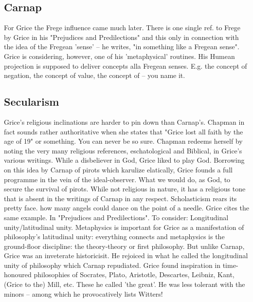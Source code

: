 \documentclass[10pt,titlepage]{book}
\begin{document}
\subsection{Carnap}

For  Grice the Frege influence came much later. There is one single ref. 
to Frege by  Grice in his "Prejudices and Predilections" and this only in 
connection with the  idea of the Fregean 'sense' -- he writes, "in something 
like a Fregean sense".  Grice is considering, however, one of his 
'metaphysical' routines. His Humean  projection is supposed to deliver concepts alla 
Fregean senses. E.g. the concept  of negation, the concept of value, the 
concept of -- you name  it.

\subsection{Secularism}

Grice's religious inclinations are harder to pin down than Carnap’s.
Chapman in  fact sounds rather authoritative when she states that 
"Grice lost all faith by  the age of 19" or something. You can never be so 
sure. Chapman redeems herself  by noting the very many religious references, 
eschatological and Biblical, in  Grice's various writings. While a disbeliever 
in God, Grice liked to play God.  Borrowing on this idea by Carnap of 
pirots which karulize elatically, Grice  founds a full programme in the vein of 
the ideal-observer. What we would do, as  God, to secure the survival of 
pirots. While not religious in nature, it has a  religious tone that is absent 
in the writings of Carnap in any  respect. 
Scholasticism  rears its pretty face. how many angels could dance on the 
point of a needle.  Grice cites the same example. In "Prejudices and 
Predilections". To consider:  Longitudinal unity/latitudinal unity. Metaphysics is 
important for Grice as a  manifestation of philosophy's latitudinal unity: 
everything connects and  metaphysics is the ground-floor discipline: the 
theory-theory or first  philosophy. But unlike Carnap, Grice was an inveterate 
historicisit. He rejoiced  in what he called the longitudinal unity of 
philosophy which Carnap repudiated.  Grice found inspiration in time-honoured 
philosophies of Socrates, Plato,  Aristotle, Descartes, Leibniz, Kant, (Grice to 
the) Mill, etc. These he called  'the great'. He was less tolerant with the 
minors -- among which he  provocatively lists Witters! 
\end{document}
